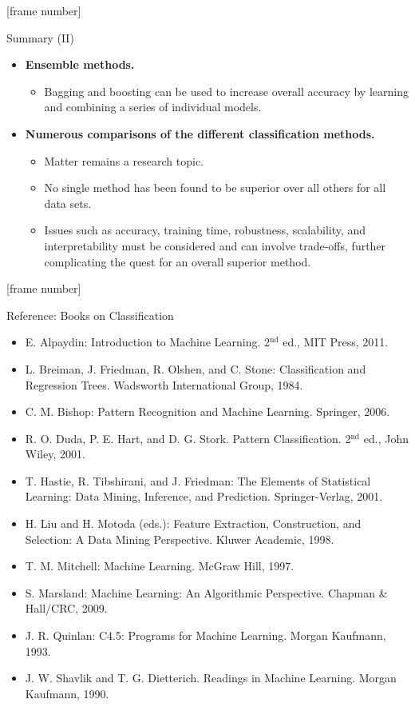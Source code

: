 \documentclass[aspectratio=169,t,table]{beamer}
\begin{document}
  {
    [frame number]
    \begin{frame}{Summary (II)}
        \begin{itemize}
          \item \textbf{Ensemble methods.}
          \begin{itemize}
            \item Bagging and boosting can be used to increase overall accuracy by learning and combining a series of individual models.
          \end{itemize}
          \item \textbf{Numerous comparisons of the different classification methods.}
          \begin{itemize}
            \item Matter remains a research topic.
            \item No single method has been found to be superior over all others for all data sets.
            \item Issues such as accuracy, training time, robustness, scalability, and interpretability must be considered and can involve trade-offs, further complicating the quest for an overall superior method.
          \end{itemize}
        \end{itemize}
    \end{frame}
  }

  {
    [frame number]
    \begin{frame}{Reference: Books on Classification}
      \begin{itemize}
        \item E. Alpaydin: Introduction to Machine Learning. 2$^\text{nd}$ ed., MIT Press, 2011.
        \item L. Breiman, J. Friedman, R. Olshen, and C. Stone: Classification and Regression Trees. Wadsworth International Group, 1984.
        \item C. M. Bishop: Pattern Recognition and Machine Learning. Springer, 2006.
        \item R. O. Duda, P. E. Hart, and D. G. Stork. Pattern Classification. 2$^\text{nd}$ ed., John Wiley, 2001.
        \item T. Hastie, R. Tibshirani, and J. Friedman: The Elements of Statistical Learning: Data Mining, Inference, and Prediction. Springer-Verlag, 2001.
        \item H. Liu and H. Motoda (eds.): Feature Extraction, Construction, and Selection: A Data Mining Perspective. Kluwer Academic, 1998.
        \item T. M. Mitchell: Machine Learning. McGraw Hill, 1997.
        \item S. Marsland: Machine Learning: An Algorithmic Perspective. Chapman \& Hall/CRC, 2009.
        \item \color{airforceblue} J. R. Quinlan: C4.5: Programs for Machine Learning. Morgan Kaufmann, 1993.
        \item J. W. Shavlik and T. G. Dietterich. Readings in Machine Learning. Morgan Kaufmann, 1990.
      \end{itemize}
    \end{frame}
  }
\end{document}
